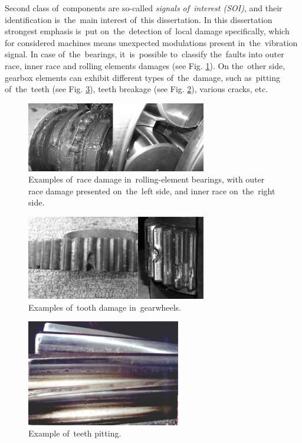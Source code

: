 Second class of~components are so-called \emph{signals of~interest (SOI)}, and their identification is~the~main interest of~this dissertation. In this dissertation strongest emphasis is~put on~the~detection of~local damage specifically, which for considered machines means unexpected modulations present in~the~vibration signal. In case of~the~bearings, it~is~possible to~classify the~faults into outer race, inner race and rolling elements damages (see Fig. \ref{fig: dmg_race}). On the~other side, gearbox elements can exhibit different types of~the~damage, such as~pitting of~the~teeth (see Fig. \ref{fig: dmg_pit}), teeth breakage (see Fig. \ref{fig: dmg_tooth}), various cracks, etc. 

\begin{figure}[ht!]
\centering
\includegraphics[width = 0.7\textwidth]{wykresy/dmg_race.png}
\caption{Examples of~race damage in~rolling-element bearings, with outer race damage presented on~the~left side, and inner race on~the~right side.}
\label{fig: dmg_race}
\end{figure}

\begin{figure}[ht!]
\centering
\includegraphics[width = 0.7\textwidth]{wykresy/dmg_tooth.png}
\caption{Examples of~tooth damage in~gearwheels.}
\label{fig: dmg_tooth}
\end{figure}

\begin{figure}[ht!]
\centering
\includegraphics[width = 0.6\textwidth]{wykresy/pitting.jpg}
\caption{Example of~teeth pitting.}
\label{fig: dmg_pit}
\end{figure}

